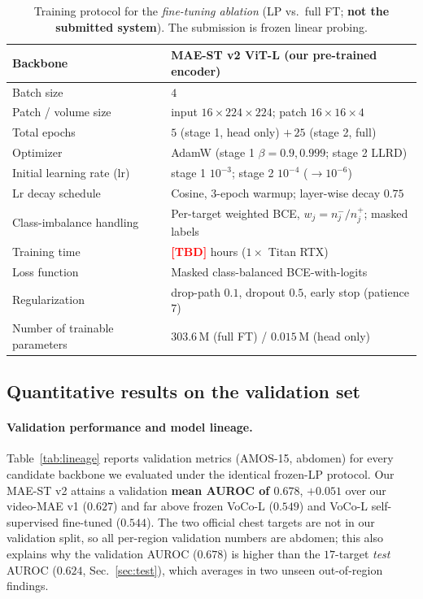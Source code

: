 \documentclass[runningheads]{llncs}
\newcommand{\tba}{\textcolor{red}{\textbf{[TBD]}}}
\begin{document}
\begin{table}[!htbp]
\caption{Training protocol for the \emph{fine-tuning ablation} (LP vs.\ full FT;
\textbf{not the submitted system}). The submission is frozen linear probing.}
\label{table:training-eao}
\begin{center}
\begin{tabular}{ll}
\hline
Backbone                        & MAE-ST v2 ViT-L (our pre-trained encoder) \\ \hline
Batch size                      & $4$ \\ \hline
Patch / volume size             & input $16\times224\times224$; patch $16\times16\times4$ \\ \hline
Total epochs                    & $5$ (stage 1, head only) $+\,25$ (stage 2, full) \\ \hline
Optimizer                       & AdamW (stage 1 $\beta=0.9,0.999$; stage 2 LLRD) \\ \hline
Initial learning rate (lr)      & stage 1 $10^{-3}$; stage 2 $10^{-4}$ ($\to 10^{-6}$) \\ \hline
Lr decay schedule               & Cosine, $3$-epoch warmup; layer-wise decay $0.75$ \\ \hline
Class-imbalance handling        & Per-target weighted BCE, $w_j=n^-_j/n^+_j$; masked labels \\ \hline
Training time                   & \tba{} hours ($1\times$ Titan RTX) \\ \hline
Loss function                   & Masked class-balanced BCE-with-logits \\ \hline
Regularization                  & drop-path $0.1$, dropout $0.5$, early stop (patience $7$) \\ \hline
Number of trainable parameters  & $303.6$\,M (full FT) / $0.015$\,M (head only) \\ \hline
\end{tabular}
\end{center}
\end{table}

\subsection{Quantitative results on the validation set}

\paragraph{Validation performance and model lineage.}
Table~\ref{tab:lineage} reports validation metrics (AMOS-15, abdomen) for every
candidate backbone we evaluated under the identical frozen-LP protocol. Our
MAE-ST v2 attains a validation \textbf{mean AUROC of $0.678$}, $+0.051$ over our
video-MAE v1 ($0.627$) and far above frozen VoCo-L ($0.549$) and VoCo-L
self-supervised fine-tuned ($0.544$). The two official chest targets are not in
our validation split, so all per-region validation numbers are abdomen; this also
explains why the validation AUROC ($0.678$) is higher than the $17$-target
\emph{test} AUROC ($0.624$, Sec.~\ref{sec:test}), which averages in two unseen
out-of-region findings.
\end{document}
